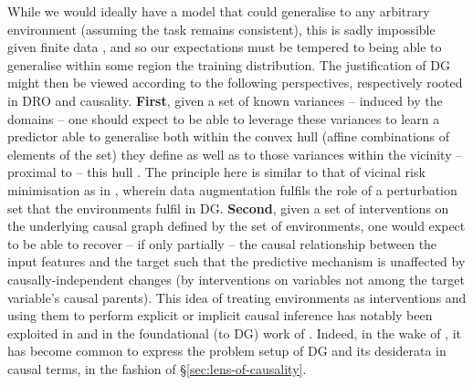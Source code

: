 %
While we would ideally have a model that could generalise to any arbitrary environment (assuming
the task remains consistent), this is sadly impossible given finite data
\citep{david2010impossibility}, and so our expectations must be tempered to being able to
generalise within some region the training distribution.
%
%
The justification of \ac{DG} might then be viewed according to the following perspectives,
respectively rooted in \ac{DRO} and causality. \textbf{First}, given a set of known variances --
induced by the domains -- one should expect to be able to leverage these variances to learn a
predictor able to generalise both within the convex hull (affine combinations of elements of the
set) they define as well as to those variances within the vicinity -- proximal to -- this hull
\citep{krueger2021out}.
The principle here is similar to that of vicinal risk minimisation \citep{chapelle2000vicinal} as
in \cite{zhang2017mixup}, wherein data augmentation fulfils the role of a perturbation set that the
environments fulfil in \ac{DG}.
%
\textbf{Second}, given a set of interventions on the underlying causal graph defined by the set of
environments, one would expect to be able to recover -- if only partially -- the causal
relationship between the input features and the target such that the predictive mechanism is
unaffected by causally-independent changes (by interventions on variables not among the target
variable's causal parents).
%
This idea of treating environments as interventions and using them to perform explicit or
implicit causal inference has notably been exploited in \cite{peters2016causal} and in the
foundational (to \ac{DG}) work of \cite{arjovsky2019invariant}.
%
Indeed, in the wake of \cite{arjovsky2019invariant}, it has become common \citep{
gulrajani2020search, krueger2021out, mahajan2021domain, lin2022zin} to express the problem setup of
\ac{DG} and its desiderata in causal terms, in the fashion of \S\ref{sec:lens-of-causality}.
%

